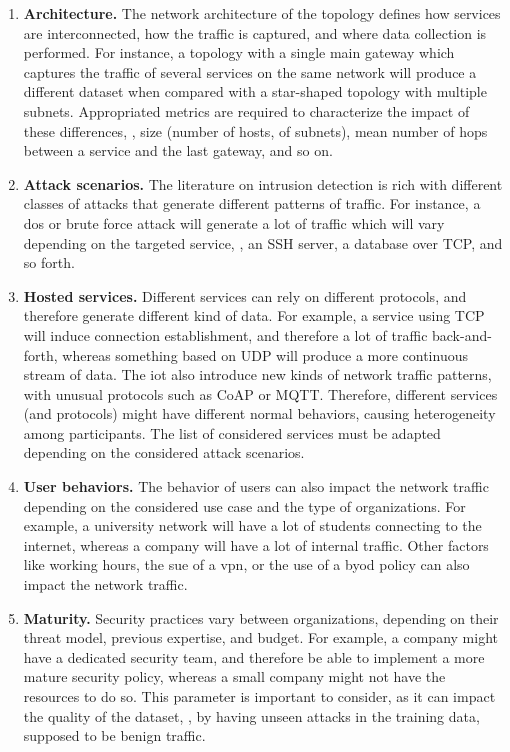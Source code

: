 \begin{enumerate}
  \item \textbf{Architecture.}
  The network architecture of the topology defines how services are interconnected, how the traffic is captured, and where data collection is performed.
  For instance, a topology with a single main gateway which captures the traffic of several services on the same network will produce a different dataset when compared with a star-shaped topology with multiple subnets.
  Appropriated metrics are required to characterize the impact of these differences, \eg, size (number of hosts, of subnets), mean number of hops between a service and the last gateway, and so on.
  
  \item \textbf{Attack scenarios.}
  The literature on intrusion detection is rich with different classes of attacks that generate different patterns of traffic.
  For instance, a \gls{dos} or brute force attack will generate a lot of traffic which will vary depending on the targeted service, \eg, an SSH server, a database over TCP, and so forth.

  \item \textbf{Hosted services.}
  Different services can rely on different protocols, and therefore generate different kind of data.
  For example, a service using TCP will induce connection establishment, and therefore a lot of traffic back-and-forth, whereas something based on UDP will produce a more continuous stream of data.
  The \gls{iot} also introduce new kinds of network traffic patterns, with unusual protocols such as CoAP or MQTT.
  Therefore, different services (and protocols) might have different normal behaviors, causing heterogeneity among participants.
  The list of considered services must be adapted depending on the considered attack scenarios. 

  \item \textbf{User behaviors.}
  The behavior of users can also impact the network traffic depending on the considered use case and the type of organizations.
  For example, a university network will have a lot of students connecting to the internet, whereas a company will have a lot of internal traffic.
  Other factors like working hours, the sue of a \gls{vpn}, or the use of a \gls{byod} policy can also impact the network traffic.
  
  \item \textbf{Maturity.}
  Security practices vary between organizations, depending on their threat model, previous expertise, and budget.
  For example, a company might have a dedicated security team, and therefore be able to implement a more mature security policy, whereas a small company might not have the resources to do so.
  This parameter is important to consider, as it can impact the quality of the dataset, \eg, by having unseen attacks in the training data, supposed to be benign traffic.
\end{enumerate}

